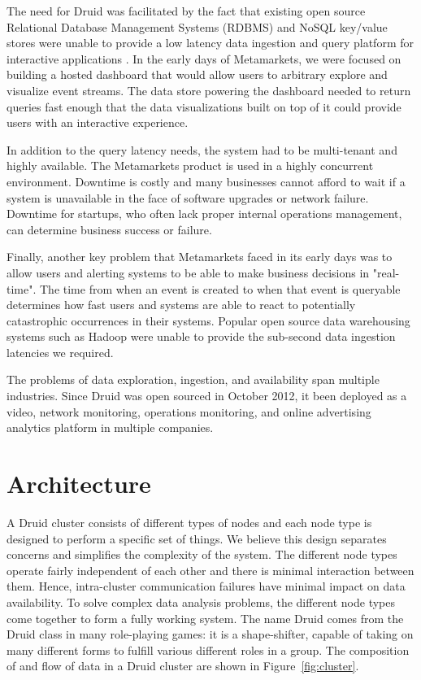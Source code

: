 \documentclass{acm_proc_article-sp}
\begin{document}
The need for Druid was facilitated by the fact that existing open source
Relational Database Management Systems (RDBMS) and NoSQL key/value stores were
unable to provide a low latency data ingestion and query platform for
interactive applications \cite{tschetter2011druid}. In the early days of
Metamarkets, we were focused on building a hosted dashboard that would allow
users to arbitrary explore and visualize event streams.  The data store
powering the dashboard needed to return queries fast enough that the data
visualizations built on top of it could provide users with an interactive
experience. 

In addition to the query latency needs, the system had to be multi-tenant and
highly available. The Metamarkets product is used in a highly concurrent
environment. Downtime is costly and many businesses cannot afford to wait if a
system is unavailable in the face of software upgrades or network failure.
Downtime for startups, who often lack proper internal operations management, can
determine business success or failure.  

Finally, another key problem that Metamarkets faced in its early days was to
allow users and alerting systems to be able to make business decisions in
"real-time". The time from when an event is created to when that
event is queryable determines how fast users and systems are able to react to
potentially catastrophic occurrences in their systems. Popular open source data
warehousing systems such as Hadoop were unable to provide the sub-second data ingestion
latencies we required. 

The problems of data exploration, ingestion, and availability span multiple
industries. Since Druid was open sourced in October 2012, it been deployed as a
video, network monitoring, operations monitoring, and online advertising
analytics platform in multiple companies.

\section{Architecture}
\label{sec:architecture}
A Druid cluster consists of different types of nodes and each node type is
designed to perform a specific set of things. We believe this design separates
concerns and simplifies the complexity of the system.  The different node types
operate fairly independent of each other and there is minimal interaction
between them. Hence, intra-cluster communication failures have minimal impact
on data availability.  To solve complex data analysis problems, the different
node types come together to form a fully working system.  The name Druid comes
from the Druid class in many role-playing games: it is a shape-shifter, capable
of taking on many different forms to fulfill various different roles in a
group.  The composition of and flow of data in a Druid cluster are shown in
Figure~\ref{fig:cluster}.
\end{document}
